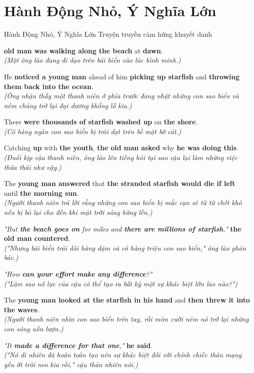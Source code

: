 \section{Hành Động Nhỏ, Ý Nghĩa Lớn}
\begin{truyen}{Hành Động Nhỏ, Ý Nghĩa Lớn}%
              {Truyện truyền cảm hứng khuyết danh}

 \textbf{old man was walking along the beach} at \textbf{dawn}.\\
\textit{(Một ông lão đang đi dạo trên bãi biển vào lúc bình minh.)}

He \textbf{noticed a young man} ahead of him \textbf{picking up starfish} and \textbf{throwing them back into the ocean}.\\
\textit{(Ông nhận thấy một thanh niên ở phía trước đang nhặt những con sao biển và ném chúng trở lại đại dương khổng lồ kia.)}

There \textbf{were thousands of starfish washed up} on \textbf{the shore}.\\
\textit{(Có hàng ngàn con sao biển bị trôi dạt trên bề mặt bờ cát.)}

Catching \textbf{up} with \textbf{the youth}, \textbf{the old man asked} why \textbf{he was doing this}.\\
\textit{(Đuổi kịp cậu thanh niên, ông lão lên tiếng hỏi tại sao cậu lại làm những việc thừa thãi như vậy.)}

The \textbf{young man answered} that \textbf{the stranded starfish would die if left} until \textbf{the morning sun}.\\
\textit{(Người thanh niên trả lời rằng những con sao biển bị mắc cạn sẽ từ từ chết khô nếu bị bỏ lại cho đến khi mặt trời sáng bừng lến.)}

\textit{"But \textbf{the beach goes on} for miles and \textbf{there are millions of starfish},"} \textbf{the old man countered}.\\
\textit{("Nhưng bãi biển trải dài hàng dặm và có hàng triệu con sao biển," ông lão phản bác.)}

\textit{"How \textbf{can your effort make any difference}?"}\\
\textit{("Làm sao nỗ lực của cậu có thể tạo ra bất kỳ một sự khác biệt lớn lao nào?")}

The \textbf{young man looked at the starfish in his hand} and \textbf{then threw it into the waves}.\\
\textit{(Người thanh niên nhìn con sao biển trên tay, rồi mỉm cười ném nó trở lại những con sóng uốn lượn.)}

\textit{"It \textbf{made a difference for that one},"} \textbf{he said}.\\
\textit{("Nó dĩ nhiên đã hoàn toàn tạo nên sự khác biệt đối với chính chiếc thân mạng yếu ớt trôi neo kia rồi," cậu thản nhiên nói.)}
\end{truyen}

